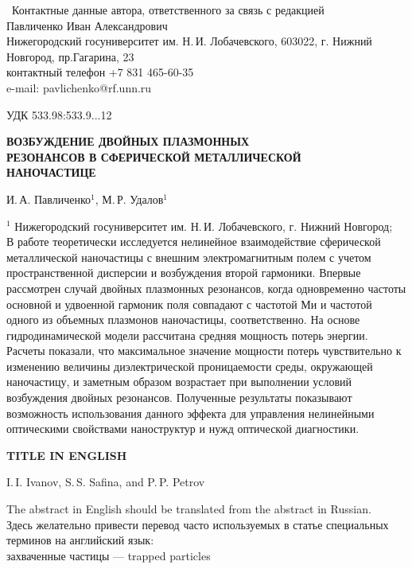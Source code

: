 \documentclass[12pt, a4paper]{article}
\begin{document}
\thispagestyle{empty}

 \ Контактные данные автора, ответственного за связь с редакцией\\
Павличенко Иван Александрович\\
Нижегородский госуниверситет им. Н.\,И. Лобачевского, 603022, г. Нижний Новгород, пр.Гагарина, 23\\
контактный телефон {+7 831 465-60-35}\\
e-mail: pavlichenko@rf.unn.ru 

\newpage
\setcounter{page}{1}

УДК 533.98{:}533.9...12
\begin{center}
\large\bf ВОЗБУЖДЕНИЕ ДВОЙНЫХ ПЛАЗМОННЫХ\\ РЕЗОНАНСОВ В СФЕРИЧЕСКОЙ МЕТАЛЛИЧЕСКОЙ\\НАНОЧАСТИЦЕ
\end{center}

И.\,А. Павличенко$^{1}$, М.\,Р. Удалов$^{1}$

$^1$ Нижегородский госуниверситет им. Н.\,И. Лобачевского, г. Нижний Новгород;\\

В работе теоретически исследуется нелинейное взаимодействие сферической металлической наночастицы с внешним электромагнитным полем с учетом пространственной дисперсии и возбуждения второй гармоники.
Впервые рассмотрен случай двойных плазмонных резонансов, когда одновременно частоты основной и удвоенной гармоник поля совпадают с частотой Ми и частотой одного из объемных плазмонов наночастицы, соответственно.
На основе гидродинамической модели рассчитана средняя мощность потерь энергии.
Расчеты показали, что максимальное значение мощности потерь 
чувствительно к изменению величины диэлектрической проницаемости среды, окружающей наночастицу, и заметным образом возрастает при выполнении условий возбуждения двойных резонансов.
Полученные результаты показывают возможность использования данного эффекта для управления нелинейными оптическими свойствами наноструктур и нужд оптической диагностики.


\newpage

{\large\bf TITLE IN ENGLISH}

I.\,I. Ivanov, S.\,S. Safina, and P.\,P. Petrov

The abstract in English should be translated from the abstract in Russian.\\

Здесь желательно привести перевод часто используемых в статье специальных терминов на английский язык:\\
захваченные частицы --- trapped particles
\end{document}
